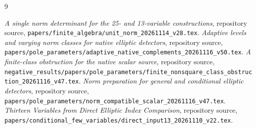 \documentclass[11pt,a4paper]{article}
\begin{document}
\begin{thebibliography}{9}\raggedright
{}
\emph{A single norm determinant for the 25- and 13-variable constructions},
repository source,
\nolinkurl{papers/finite_algebra/unit_norm_20261114_v28.tex}.
\emph{Adaptive levels and varying norm classes for native elliptic detectors},
repository source,
\nolinkurl{papers/pole_parameters/adaptive_native_complements_20261116_v50.tex}.
\emph{A finite-class obstruction for the native scalar source},
repository source,
\nolinkurl{negative_results/papers/pole_parameters/finite_nonsquare_class_obstruction_20261116_v47.tex}.
\emph{Norm preparation for general and conditional elliptic detectors},
repository source,
\nolinkurl{papers/pole_parameters/norm_compatible_scalar_20261116_v47.tex}.
\emph{Thirteen Variables from Direct Elliptic Index Comparison},
repository source,
\nolinkurl{papers/conditional_few_variables/direct_input13_20261110_v22.tex}.
\end{thebibliography}
\end{document}
